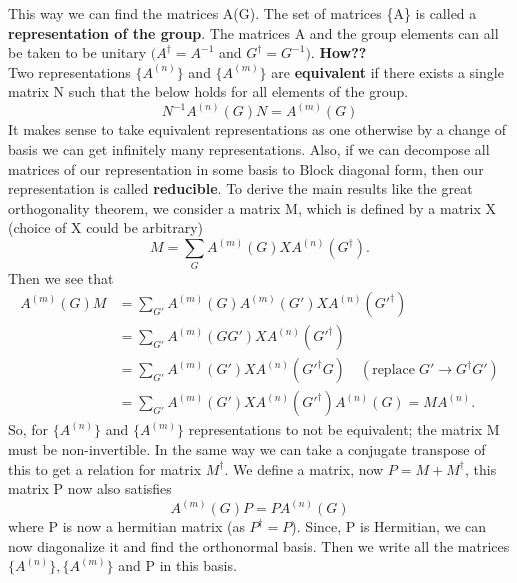 \documentclass{article}
\begin{document}
	This way we can find the matrices A(G). The set of matrices \{A\} is called a \textbf{representation of the group}. The matrices A and the group elements can all be taken to be unitary $(A^\dagger = A^{-1}$ and $G^\dagger = G^{-1})$. \textbf{How??} \\
	Two representations $\{A^{(n)}\}$ and $\{A^{(m)}\}$ are \textbf{equivalent} if there exists a single matrix N such that the below holds for all elements of the group.
	\begin{equation}
		N^{-1} A^{(n)} (G) N =  A^{(m)}(G)
	\end{equation} 
	It makes sense to take equivalent representations as one otherwise by a change of basis we can get infinitely many representations. Also, if we can decompose all matrices of our representation in some basis to Block diagonal form, then our representation is called \textbf{reducible}. To derive the main results like the great orthogonality theorem, we consider a matrix M, which is defined by a matrix X (choice of X could be arbitrary)
	\begin{equation}\label{Eqn:define-M}
		M = \sum_G  A^{(m)}(G) X  A^{(n)}(G^\dagger).
	\end{equation}
	Then we see that
	\begin{equation}\label{Eqn:relation between representations}
		\begin{split}
			 A^{(m)}(G) M &= \sum_{G'} A^{(m)}(G) A^{(m)}(G') X  A^{(n)}(G'^\dagger)\\
			 &= \sum_{G'} A^{(m)}(GG') X  A^{(n)}(G'^\dagger)\\
			 &= \sum_{G'} A^{(m)}(G') X  A^{(n)}(G'^\dagger G) \quad (\mathrm{replace} \; G' \to G^\dagger G')\\
			  &= \sum_{G'} A^{(m)}(G') X  A^{(n)}(G'^\dagger)A^{(n)}( G) = MA^{(n)}.
		\end{split}
	\end{equation}
	So, for $\{A^{(n)}\}$ and $\{A^{(m)}\}$ representations to not be equivalent; the matrix M must be non-invertible. In the same way we can take a conjugate transpose of this to get a relation for matrix $M^\dagger$. We define a matrix, now $P = M + M^\dagger$, this matrix P now also satisfies
	\begin{equation}
		A^{(m)}(G) P = P A^{(n)}(G) 
	\end{equation}
	where P is now a hermitian matrix (as $P^\dagger = P$). Since, P is Hermitian, we can now diagonalize it and find the orthonormal basis. Then we write all the matrices $\{A^{(n)}\},\{A^{(m)}\}$ and P in this basis.\\\\
\end{document}
